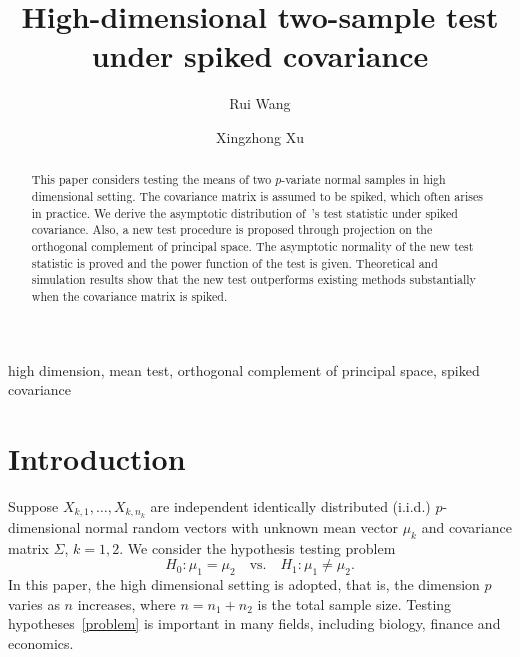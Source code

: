 \documentclass[review]{elsarticle}
\theoremstyle{plain}
\theoremstyle{definition}
\theoremstyle{remark}
\begin{document}
\begin{frontmatter}

\title{High-dimensional two-sample test under spiked covariance}

    \author[mymainaddress]{Rui Wang}
    \author[mymainaddress,mysecondaryaddress]{Xingzhong Xu}
    \address[mymainaddress]{School of Mathematics and Statistics, Beijing Institute of Technology, Beijing 
    100081,China}
    \address[mysecondaryaddress]{Beijing Key Laboratory on MCAACI, Beijing Institute of Technology, Beijing 100081,China}




\begin{abstract}
    This paper considers testing the means of two $p$-variate normal samples in high dimensional setting.
    The covariance matrix is assumed to be spiked, which often arises in practice. 
    We derive the asymptotic distribution of~\cite{Chen2010A}'s test statistic under spiked covariance.
    Also, a new test procedure is proposed through projection on the orthogonal complement of principal space.
    The asymptotic normality of the new test statistic is proved and the power function of the test is given.
    Theoretical and simulation results show that the new test outperforms existing methods substantially when the covariance matrix is spiked.
\end{abstract}

\begin{keyword}
    high dimension, mean test, orthogonal complement of principal space, spiked covariance
\end{keyword}

\end{frontmatter}




\section{Introduction}

Suppose $X_{k,1},\ldots,X_{k,n_k}$  are independent identically distributed (i.i.d.) $p$-dimensional normal random vectors with unknown mean vector $\mu_k$ and covariance matrix $\Sigma$, $k=1,2$. We consider the hypothesis testing problem
\begin{equation}\label{problem}
    H_0:\mu_1=\mu_2\quad \textrm{vs.}\quad H_1:\mu_1\neq \mu_2.
\end{equation}
 In this paper, {the} high dimensional setting is adopted, that is, the dimension $p$ varies as $n$ increases, where $n=n_1+n_2$ is the total sample size.
Testing hypotheses~\eqref{problem} is important in many fields, including biology, finance and economics.
\end{document}
